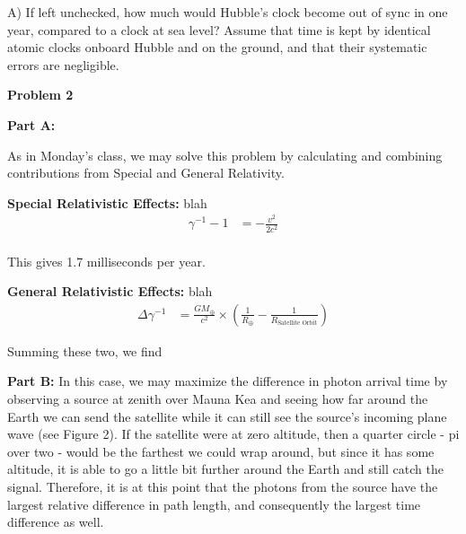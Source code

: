 \documentclass[12pt]{article}
\begin{document}
\begin{onehalfspacing}
A) If left unchecked, how much would Hubble’s clock become out of sync in one year,
compared to a clock at sea level? Assume that time is kept by identical atomic clocks
onboard Hubble and on the ground, and that their systematic errors are negligible.

\fi
\raggedright{\textbf{\Large Problem 2}}\\


\bigskip
\bigskip
\raggedright{\textbf{\large Part A: }}

As in Monday's class, we may solve this problem by calculating and combining contributions from Special and General Relativity.

\bigskip

\textbf{Special Relativistic Effects:} blah
\begin{align*}
  \gamma^{-1} -1 &= - \frac{v^2}{2 c^2} \\
\end{align*}


This gives 1.7 milliseconds per year.

\textbf{General Relativistic Effects:} blah
\begin{align*}
  \Delta \gamma^{-1} &= \frac{G M_{\oplus}}{c^2} \times \left( \frac{1}{R_{\oplus}} - \frac{1}{R_{\text{Satellite Orbit}}} \right)
\end{align*}


Summing these two, we find

\bigskip
\bigskip
\raggedright{\textbf{\large Part B: }}
In this case, we may maximize the difference in photon arrival time by observing a source at zenith over Mauna Kea and seeing how far around the Earth we can send the satellite while it can still see the source's incoming plane wave (see Figure 2). If the satellite were at zero altitude, then a quarter circle - pi over two - would be the farthest we could wrap around, but since it has some altitude, it is able to go a little bit further around the Earth and still catch the signal. Therefore, it is at this point that the photons from the source have the largest relative difference in path length, and consequently the largest time difference as well.


\end{onehalfspacing}
\end{document}
